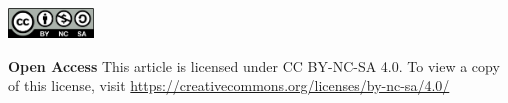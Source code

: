 \vspace{8mm}
\noindent
\includegraphics[height=8mm]{licenses/by-nc-sa}

\begin{spacing}{.6}
\noindent
\textbf{Open Access} This article is licensed under CC BY-NC-SA 4.0. To view a copy of this license, visit \url{https://creativecommons.org/licenses/by-nc-sa/4.0/}
\end{spacing}
